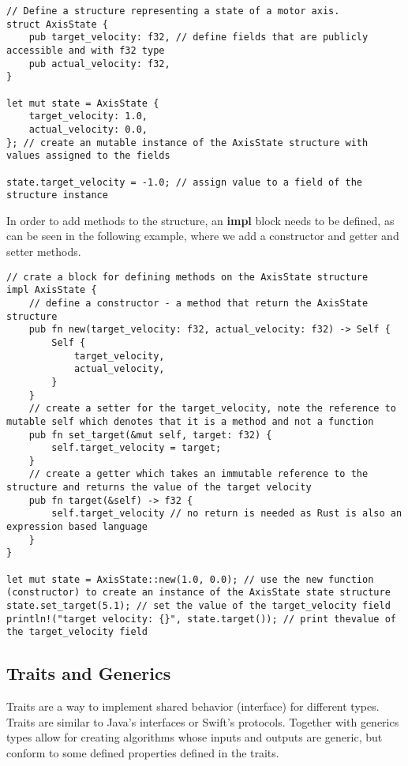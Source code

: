 \begin{lstlisting}
// Define a structure representing a state of a motor axis.
struct AxisState {
    pub target_velocity: f32, // define fields that are publicly accessible and with f32 type
    pub actual_velocity: f32,
}

let mut state = AxisState {
    target_velocity: 1.0,
    actual_velocity: 0.0,
}; // create an mutable instance of the AxisState structure with values assigned to the fields

state.target_velocity = -1.0; // assign value to a field of the structure instance
\end{lstlisting}

In order to add methods to the structure, an \textbf{impl} block needs to be defined, as can be seen in the following example, where we add a constructor and getter and setter methods.
\newpage
\begin{lstlisting}
// crate a block for defining methods on the AxisState structure
impl AxisState {
    // define a constructor - a method that return the AxisState structure
    pub fn new(target_velocity: f32, actual_velocity: f32) -> Self {
        Self {
            target_velocity,
            actual_velocity,
        }
    }
    // create a setter for the target_velocity, note the reference to mutable self which denotes that it is a method and not a function
    pub fn set_target(&mut self, target: f32) {
        self.target_velocity = target;
    }
    // create a getter which takes an immutable reference to the structure and returns the value of the target velocity
    pub fn target(&self) -> f32 {
        self.target_velocity // no return is needed as Rust is also an expression based language
    }
}

let mut state = AxisState::new(1.0, 0.0); // use the new function (constructor) to create an instance of the AxisState state structure
state.set_target(5.1); // set the value of the target_velocity field
println!("target velocity: {}", state.target()); // print thevalue of the target_velocity field
\end{lstlisting}

\subsection{Traits and Generics}
\label{subsec:traits}
Traits are a way to implement shared behavior (interface) for different types.
Traits are similar to Java's interfaces or Swift's protocols.
Together with generics types allow for creating algorithms whose inputs and outputs are generic, but conform to some defined properties defined in the traits.

